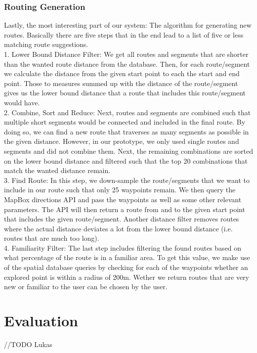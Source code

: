 \documentclass{sigchi}
\begin{document}
\subsubsection{Routing Generation}
Lastly, the most interesting part of our system: The algorithm for generating new routes. Basically there are five steps that in the end lead to a list of five or less matching route suggestions.\\
1. Lower Bound Distance Filter: We get all routes and segments that are shorter than the wanted route distance from the database. Then, for each route/segment we calculate the distance from the given start point to each the start and end point. Those to measures summed up with the distance of the route/segment gives us the lower bound distance that a route that includes this route/segment would have.\\
2. Combine, Sort and Reduce: Next, routes and segments are combined such that multiple short segments would be connected and included in the final route. By doing so, we can find a new route that traverses as many segments as possible in the given distance. However, in our prototype, we only used single routes and segments and did not combine them. Next, the remaining combinations are sorted on the lower bound distance and filtered such that the top 20 combinations that match the wanted distance remain.\\
3. Find Route: In this step, we down-sample the route/segments that we want to include in our route such that only 25 waypoints remain. We then query the MapBox directions API and pass the waypoints as well as some other relevant parameters. The API will then return a route from and to the given start point that includes the given route/segment. Another distance filter removes routes where the actual distance deviates a lot from the lower bound distance (i.e. routes that are much too long).\\
4. Familiarity Filter: The last step includes filtering the found routes based on what percentage of the route is in a familiar area. To get this value, we make use of the spatial database queries by checking for each of the waypoints whether an explored point is within a radius of 200m. Wether we return routes that are very new or familiar to the user can be chosen by the user.\\

\section{Evaluation}
//TODO Lukas
\end{document}

